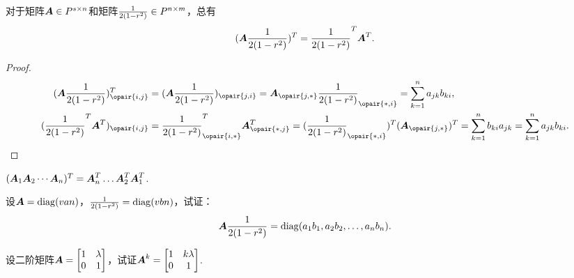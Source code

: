 \begin{theorem}\label{theorem:矩阵.矩阵乘积的转置}
对于矩阵\(\boldsymbol{A} \in P^{s \times n}\)和矩阵\(\frac{1}{2(1-r^2)} \in P^{n \times m}\)，总有\[
(\boldsymbol{A}\frac{1}{2(1-r^2)})^T = \frac{1}{2(1-r^2)}^T \boldsymbol{A}^T.
\]
\begin{proof}
\begin{align*}
(\A \B)^T_{\opair{i,j}}
&= (\A \B)_{\opair{j,i}}
= \A_{\opair{j,*}} \B_{\opair{*,i}}
= \sum\limits_{k=1}^n a_{jk} b_{ki}, \\
(\B^T \A^T)_{\opair{i,j}}
&= \B^T_{\opair{i,*}} \A^T_{\opair{*,j}}
= (\B_{\opair{*,i}})^T (\A_{\opair{j,*}})^T
= \sum\limits_{k=1}^n b_{ki} a_{jk}
= \sum\limits_{k=1}^n a_{jk} b_{ki}.
\qedhere
\end{align*}
\end{proof}
\end{theorem}

\begin{corollary}
\((\boldsymbol{A}_1 \boldsymbol{A}_2 \dotsb \boldsymbol{A}_n)^T = \boldsymbol{A}_n^T \dots \boldsymbol{A}_2^T \boldsymbol{A}_1^T\).
\end{corollary}

\begin{example}
设\(\boldsymbol{A}=\operatorname{diag}(v{a}{n})\)，\(\frac{1}{2(1-r^2)}=\operatorname{diag}(v{b}{n})\)，试证：\[
\boldsymbol{A} \frac{1}{2(1-r^2)} = \operatorname{diag}(a_1 b_1,a_2 b_2,\dotsc,a_n b_n).
\]
\end{example}

\begin{example}
设二阶矩阵\(\boldsymbol{A}=\begin{bmatrix} 1 & \lambda \\ 0 & 1 \end{bmatrix}\)，试证\(\boldsymbol{A}^k=\begin{bmatrix} 1 & k\lambda \\ 0 & 1 \end{bmatrix}\).
\end{example}


